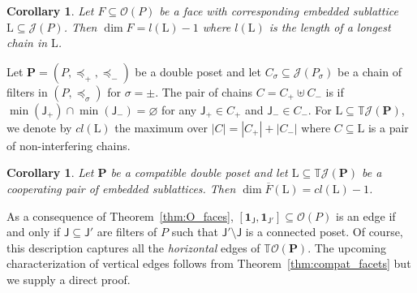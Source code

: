 \documentclass[11pt]{amsart}
\newtheorem{cor}[thm]{Corollary}
\theoremstyle{definition}
\begin{document}
\begin{cor}\label{cor:O_dim_faces}
    Let $F \subseteq {\mathcal{O}({P})}$ be a face with corresponding embedded
    sublattice ${\mathrm{L}} \subseteq {{\mathcal{J}}({P})}$. Then $\dim F = l({\mathrm{L}}) - 1$ where
    $l({\mathrm{L}})$ is the length of a longest chain in ${\mathrm{L}}$.
\end{cor}

Let ${\mathbf{P}} = ({P},\preceq_+,\preceq_-)$ be a double poset and let $C_\sigma
\subseteq {{\mathcal{J}}({{P}_\sigma})}$ be a chain of filters in $({P},\preceq_\sigma)$ for
$\sigma = \pm$.  The pair of chains $C = C_+ \uplus C_-$ is
{\textbf{\color{black}{non-interfering}}} if $\min({\mathsf{J}}_+) \cap \min({\mathsf{J}}_-) = {\varnothing}$
for any ${\mathsf{J}}_+ \in C_+$ and ${\mathsf{J}}_- \in C_-$. For ${\mathrm{L}} \subseteq
{{\mathbb{T}}{{\mathcal{J}}({{\mathbf{P}}})}}$, we denote by  $cl({\mathrm{L}})$ the maximum over $|C| = |C_+| + |C_-|$
where $C \subseteq {\mathrm{L}}$ is a pair of non-interfering chains.

\begin{cor}\label{cor:TO_dim_face}
    Let ${\mathbf{P}}$ be a compatible double poset and let ${\mathrm{L}} \subseteq
    {{\mathbb{T}}{{\mathcal{J}}({{\mathbf{P}}})}}$ be a cooperating pair of embedded sublattices. Then $\dim
    {\overline{F}({\mathrm{L}})} = cl({\mathrm{L}})-1$.
\end{cor}

As a consequence of Theorem~\ref{thm:O_faces}, 
$[{\mathbf{1}}_{\mathsf{J}},{\mathbf{1}}_{{\mathsf{J}}'}] \subseteq {\mathcal{O}({P})}$ is an edge if and only if
${\mathsf{J}} \subseteq {\mathsf{J}}'$ are filters of ${P}$ such that ${\mathsf{J}}' \setminus
{\mathsf{J}}$ is a connected poset. Of course, this description captures all the
\emph{horizontal} edges of ${{\mathbb{T}}{\mathcal{O}({\mathbf{P}})}}$. The upcoming characterization
of vertical edges follows from Theorem~\ref{thm:compat_facets} but we
supply a direct proof.
\end{document}
